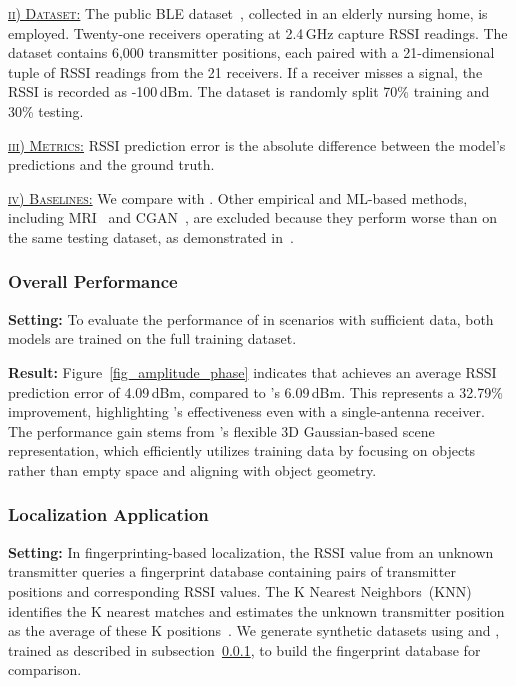 \underline{\textsc{ii) Dataset:}}
The public BLE dataset~\cite{zhao2023nerf}, collected in an elderly nursing home, is employed.  
Twenty-one receivers operating at 2.4\,GHz capture RSSI readings.  
The dataset contains 6,000 transmitter positions, each paired with a 21-dimensional tuple of RSSI readings from the 21 receivers.  
If a receiver misses a signal, the RSSI is recorded as -100\,dBm.  
The dataset is randomly split 70\% training and 30\% testing.  


\underline{\textsc{iii) Metrics:}}
RSSI prediction error is the absolute difference between the model's predictions and the ground truth.


\underline{\textsc{iv) Baselines:}}
We compare \ourSystem with \nerft. 
Other empirical and ML-based methods, including MRI~\cite{shin2014mri} and CGAN~\cite{parralejo2021comparative}, are excluded because they perform worse than \nerft on the same testing dataset, as demonstrated in~\cite{zhao2023nerf}.  




\subsubsection{Overall Performance}\label{sec_ble_overall}

\textbf{Setting:}
To evaluate the performance of \ourSystem in scenarios with sufficient data, both models are trained on the full training dataset.  



\textbf{Result:}  
Figure~\ref{fig_amplitude_phase} indicates that \ourSystem achieves an average RSSI prediction error of 4.09\,dBm, compared to \nerft's 6.09\,dBm.
This represents a 32.79\% improvement, highlighting \ourSystem's effectiveness even with a single-antenna receiver.
The performance gain stems from \ourSystem's flexible 3D Gaussian-based scene representation, which efficiently utilizes training data by focusing on objects rather than empty space and aligning with object geometry.  




\subsubsection{Localization Application}  
\textbf{Setting:}
In fingerprinting-based localization, the RSSI value from an unknown transmitter queries a fingerprint database containing pairs of transmitter positions and corresponding RSSI values.  
The K Nearest Neighbors~(KNN) identifies the K nearest matches and estimates the unknown transmitter position as the average of these K positions~\cite{parralejo2021comparative}. We generate synthetic datasets using \ourSystem and \nerft, trained as described in subsection~\ref{sec_ble_overall}, to build the fingerprint database for comparison.  



